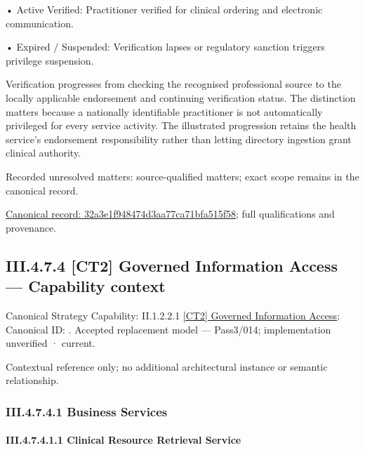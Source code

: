 •
Active Verified: Practitioner verified for clinical ordering and electronic communication.



•
Expired / Suspended: Verification lapses or regulatory sanction triggers privilege suspension.



Verification progresses from checking the recognised professional source to the locally applicable endorsement and continuing verification status. The distinction matters because a nationally identifiable practitioner is not automatically privileged for every service activity. The illustrated progression retains the health service's endorsement responsibility rather than letting directory ingestion grant clinical authority.


{\small Recorded unresolved matters: source-qualified matters; exact scope remains in the canonical record.}\par
{\footnotesize \href{../../../../../../../continuum/business/business-process/32a3e1f948474d3aa77ca71bfa515f58.md}{Canonical record: 32a3e1f948474d3aa77ca71bfa515f58}; full qualifications and provenance.}\par
\subsection*{III.4.7.4 [CT2] Governed Information Access — Capability context}
\label{navigation:III.4.7.4}

{\small Canonical Strategy Capability: II.1.2.2.1 \hyperref[element:43146a505617462f96c38459b465bcf1]{[CT2] Governed Information Access}; Canonical ID: \texttt{}. Accepted replacement model — Pass3/014; implementation unverified · current.}\par
Contextual reference only; no additional architectural instance or semantic relationship.\par
\subsubsection*{III.4.7.4.1 Business Services}
\label{navigation:III.4.7.4.1}

\paragraph*{III.4.7.4.1.1 Clinical Resource Retrieval Service}
\label{navigation:III.4.7.4.1.1}

